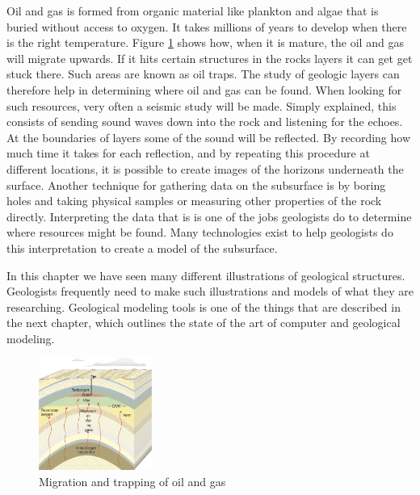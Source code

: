 \documentclass[a4paper,12pt]{report}
\begin{document}
Oil and gas is formed from organic material like plankton and algae that is buried without access to oxygen. It takes millions of years to develop when there is the right temperature. Figure \ref{fig:oilMigrate} shows how, when it is mature, the oil and gas will migrate upwards. If it hits certain structures in the rocks layers it can get get stuck there. Such areas are known as oil traps. The study of geologic layers can therefore help in determining where oil and gas can be found. When looking for such resources, very often a seismic study will be made. Simply explained, this consists of sending sound waves down into the rock and listening for the echoes. At the boundaries of layers some of the sound will be reflected. By recording how much time it takes for each reflection, and by repeating this procedure at different locations, it is possible to create images of the horizons underneath the surface. Another technique for gathering data on the subsurface is by boring holes and taking physical samples or measuring other properties of the rock directly. Interpreting the data that is is one of the jobs geologists do to determine where resources might be found. Many technologies exist to help geologists do this interpretation to create a model of the subsurface.

In this chapter we have seen many different illustrations of geological structures. Geologists frequently need to make such illustrations and models of what they are researching. Geological modeling tools is one of the things that are described in the next chapter, which outlines the state of the art of computer and geological modeling.
 \begin{figure}
  
 \begin{center}
    \includegraphics[width=0.33\textwidth]{thesis/geo/oilMigrate.png}
  \end{center}
  \caption{Migration and trapping of oil and gas}
  \label{fig:oilMigrate}
 \end{figure}
\end{document}
